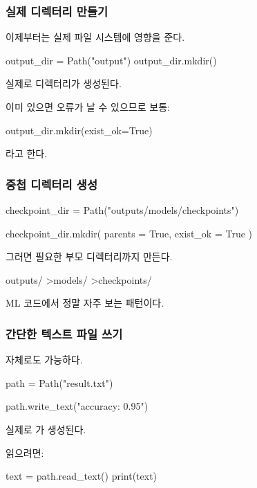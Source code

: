 \subsubsection{실제 디렉터리 만들기}

이제부터는 실제 파일 시스템에 영향을 준다.

\begin{dhkcode}
output_dir = Path("output")
output_dir.mkdir()
\end{dhkcode}

실제로 디렉터리가 생성된다.

이미 있으면 오류가 날 수 있으므로 보통:

\begin{dhkcode}
output_dir.mkdir(exist_ok=True)
\end{dhkcode}

라고 한다.

\subsubsection{중첩 디렉터리 생성}

\begin{dhkcode}
checkpoint_dir = Path("outputs/models/checkpoints")

checkpoint_dir.mkdir(
    parents = True,
    exist_ok = True
)
\end{dhkcode}

그러면 필요한 부모 디렉터리까지 만든다.

\begin{dhkdir}
outputs/
>models/
>checkpoints/
\end{dhkdir}

ML 코드에서 정말 자주 보는 패턴이다.

\subsubsection{간단한 텍스트 파일 쓰기}

자체로도 가능하다.

\begin{dhkcode}
path = Path("result.txt")

path.write_text("accuracy: 0.95")
\end{dhkcode}

실제로 가 생성된다.

읽으려면:

\begin{dhkcode}
text = path.read_text()
print(text)
\end{dhkcode}

